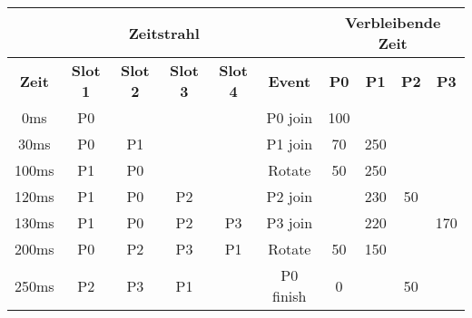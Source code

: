 \begin{frame}
    \begin{table}[]
        \begin{adjustbox}{width=0.8\textwidth}
            \begin{tabular}{c|cccc|c|cccc}
                \multicolumn{6}{c}{\textbf{Zeitstrahl}} & \multicolumn{4}{|c}{\textbf{Verbleibende Zeit}}                                                                                                                                \\ \hline
                \textbf{Zeit}                           & \textbf{Slot 1}                                 & \textbf{Slot 2} & \textbf{Slot 3} & \textbf{Slot 4} & \textbf{Event} & \textbf{P0} & \textbf{P1} & \textbf{P2} & \textbf{P3} \\ \hline
                0ms                                     & \alert{P0}                                      &                 &                 &                 & P0 join        & \alert{100} &             &             &             \\
                \pause 30ms                             & P0                                              & \alert{P1}      &                 &                 & P1 join        & \alert{70}  & 250         &             &             \\
                \pause 100ms                            & \alert{P1}                                      & \alert{P0}      &                 &                 & \alert{Rotate} & \alert{50}  & 250         &             &             \\
                \pause 120ms                            & P1                                              & P0              & \alert{P2}      &                 & P2 join        &             & \alert{230} & 50          &             \\
                \pause 130ms                            & P1                                              & P0              & P2              & \alert{P3}      & P3 join        &             & \alert{220} &             & 170         \\
                \pause 200ms                            & \alert{P0}                                      & \alert{P2}      & \alert{P3}      & \alert{P1}      & \alert{Rotate} & 50          & \alert{150} &             &             \\
                \pause 250ms                            & P2                                              & P3              & P1              &                 & P0 finish      & \alert{0}   &             & 50          &             \\

\end{tabular}
\end{adjustbox}
\end{table}
\end{frame}

